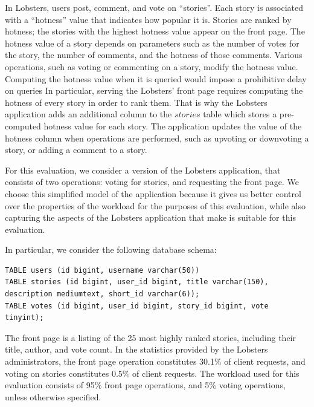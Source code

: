 \bigskip
\noindent
In Lobsters, users post, comment, and vote on ``stories''.
Each story is associated with a ``hotness'' value that indicates how popular it is.
Stories are ranked by hotness;
the stories with the highest hotness value appear on the front page.
The hotness value of a story depends on parameters such as the number of votes for the story,
the number of comments, and the hotness of those comments.
Various operations, such as voting or commenting on a story, modify the hotness value.
Computing the hotness value when it is queried would impose a prohibitive delay on queries
In particular, serving the Lobsters' front page requires computing the hotness of every story in order to rank them.
That is why the Lobsters application adds an additional column to the $stories$ table which stores a pre-computed
hotness value for each story.
The application updates the value of the hotness column when operations are performed,
such as upvoting or downvoting a story, or adding a comment to a story.

For this evaluation, we consider a version of the Lobsters application, that consists of two operations:
voting for stories, and requesting the front page.
We choose this simplified model of the application because it gives us better control over the properties of the workload
for the purposes of this evaluation,
while also capturing the aspects of the Lobsters application that make is suitable for this evaluation.

In particular, we consider the following database schema:

\begin{lstlisting}[caption={Simplified Lobsters schema used in this evaluation.}]
TABLE users (id bigint, username varchar(50))
TABLE stories (id bigint, user_id bigint, title varchar(150), description mediumtext, short_id varchar(6));
TABLE votes (id bigint, user_id bigint, story_id bigint, vote tinyint);
\end{lstlisting}

The front page is a listing of the 25 most highly ranked stories, including their title, author, and vote count.
In the statistics provided by the Lobsters administrators, the front page operation constitutes 30.1\% of client requests,
and voting on stories constitutes 0.5\% of client requests.
The workload used for this evaluation consists of 95\% front page operations, and 5\% voting operations, unless otherwise specified.

